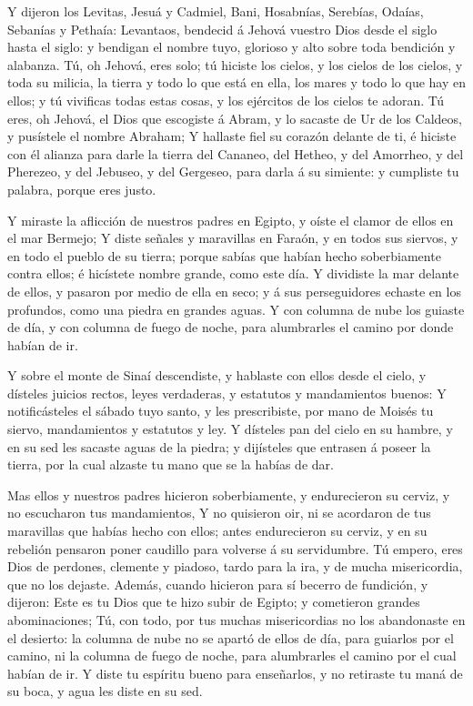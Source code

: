  Y dijeron los Levitas, Jesuá y Cadmiel, Bani, Hosabnías,
Serebías, Odaías, Sebanías y Pethaía: Levantaos, bendecid á Jehová
vuestro Dios desde el siglo hasta el siglo: y bendigan el nombre tuyo,
glorioso y alto sobre toda bendición y alabanza.  Tú, oh
Jehová, eres solo; tú hiciste los cielos, y los cielos de los cielos, y
toda su milicia, la tierra y todo lo que está en ella, los mares y todo
lo que hay en ellos; y tú vivificas todas estas cosas, y los ejércitos
de los cielos te adoran.  Tú eres, oh Jehová, el Dios que
escogiste á Abram, y lo sacaste de Ur de los Caldeos, y pusístele el
nombre Abraham;  Y hallaste fiel su corazón delante de ti, é
hiciste con él alianza para darle la tierra del Cananeo, del Hetheo, y
del Amorrheo, y del Pherezeo, y del Jebuseo, y del Gergeseo, para darla
á su simiente: y cumpliste tu palabra, porque eres justo.

 Y miraste la aflicción de nuestros padres en Egipto, y
oíste el clamor de ellos en el mar Bermejo;  Y diste
señales y maravillas en Faraón, y en todos sus siervos, y en todo el
pueblo de su tierra; porque sabías que habían hecho soberbiamente contra
ellos; é hicístete nombre grande, como este día.  Y
dividiste la mar delante de ellos, y pasaron por medio de ella en seco;
y á sus perseguidores echaste en los profundos, como una piedra en
grandes aguas.  Y con columna de nube los guiaste de día, y
con columna de fuego de noche, para alumbrarles el camino por donde
habían de ir.

 Y sobre el monte de Sinaí descendiste, y hablaste con
ellos desde el cielo, y dísteles juicios rectos, leyes verdaderas, y
estatutos y mandamientos buenos:  Y notificásteles el
sábado tuyo santo, y les prescribiste, por mano de Moisés tu siervo,
mandamientos y estatutos y ley.  Y dísteles pan del cielo
en su hambre, y en su sed les sacaste aguas de la piedra; y dijísteles
que entrasen á poseer la tierra, por la cual alzaste tu mano que se la
habías de dar.

 Mas ellos y nuestros padres hicieron soberbiamente, y
endurecieron su cerviz, y no escucharon tus mandamientos, 
Y no quisieron oir, ni se acordaron de tus maravillas que habías hecho
con ellos; antes endurecieron su cerviz, y en su rebelión pensaron poner
caudillo para volverse á su servidumbre. Tú empero, eres Dios de
perdones, clemente y piadoso, tardo para la ira, y de mucha
misericordia, que no los dejaste.  Además, cuando hicieron
para sí becerro de fundición, y dijeron: Este es tu Dios que te hizo
subir de Egipto; y cometieron grandes abominaciones;  Tú,
con todo, por tus muchas misericordias no los abandonaste en el
desierto: la columna de nube no se apartó de ellos de día, para guiarlos
por el camino, ni la columna de fuego de noche, para alumbrarles el
camino por el cual habían de ir.  Y diste tu espíritu bueno
para enseñarlos, y no retiraste tu maná de su boca, y agua les diste en
su sed.

